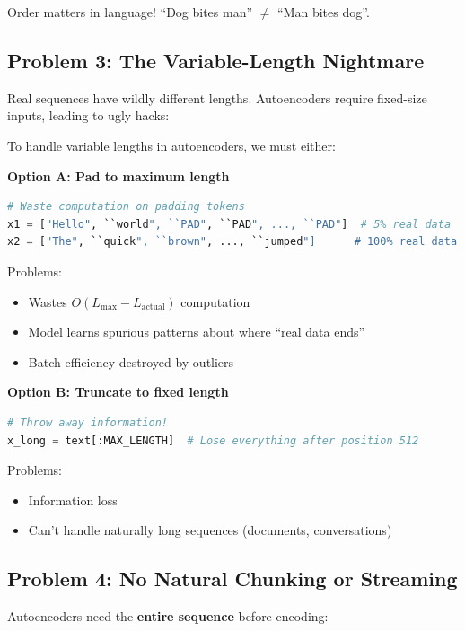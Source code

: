 \documentclass{article}
\begin{document}
Order matters in language! ``Dog bites man'' $\neq$ ``Man bites dog''.

\subsection{Problem 3: The Variable-Length Nightmare}

Real sequences have wildly different lengths. Autoencoders require fixed-size inputs, leading to ugly hacks:

\begin{tcolorbox}[colback=yellow!5!white, colframe=orange!50!black, title=The Padding Problem]
To handle variable lengths in autoencoders, we must either:

\textbf{Option A: Pad to maximum length}
\begin{lstlisting}[language=Python]
# Waste computation on padding tokens
x1 = ["Hello", ``world", ``PAD", ``PAD", ..., ``PAD"]  # 5% real data
x2 = ["The", ``quick", ``brown", ..., ``jumped"]      # 100% real data
\end{lstlisting}

Problems:
\begin{itemize}
\item Wastes $O(L_{\text{max}} - L_{\text{actual}})$ computation
\item Model learns spurious patterns about where ``real data ends''
\item Batch efficiency destroyed by outliers
\end{itemize}

\textbf{Option B: Truncate to fixed length}
\begin{lstlisting}[language=Python]
# Throw away information!
x_long = text[:MAX_LENGTH]  # Lose everything after position 512
\end{lstlisting}

Problems:
\begin{itemize}
\item Information loss
\item Can't handle naturally long sequences (documents, conversations)
\end{itemize}
\end{tcolorbox}

\subsection{Problem 4: No Natural Chunking or Streaming}

Autoencoders need the \textbf{entire sequence} before encoding:
\end{document}
